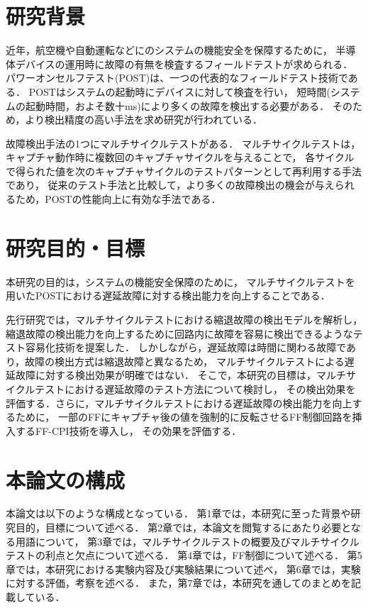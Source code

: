 
\section{研究背景}
近年，航空機や自動運転などにのシステムの機能安全を保障するために，
半導体デバイスの運用時に故障の有無を検査するフィールドテストが求められる．
パワーオンセルフテスト(POST)は、一つの代表的なフィールドテスト技術である．
POSTはシステムの起動時にデバイスに対して検査を行い，
短時間(システムの起動時間，およそ数十ms)により多くの故障を検出する必要がある．
そのため，より検出精度の高い手法を求め研究が行われている．

故障検出手法の1つにマルチサイクルテスト\cite{multicycle}がある．
マルチサイクルテストは，キャプチャ動作時に複数回のキャプチャサイクルを与えることで，
各サイクルで得られた値を次のキャプチャサイクルのテストパターンとして再利用する手法であり，
従来のテスト手法と比較して，より多くの故障検出の機会が与えられるため，POSTの性能向上に有効な手法である．

\section{研究目的・目標}
本研究の目的は，システムの機能安全保障のために，
マルチサイクルテストを用いたPOSTにおける遅延故障に対する検出能力を向上することである．

先行研究では，マルチサイクルテストにおける縮退故障の検出モデルを解析し，
縮退故障の検出能力を向上するために回路内に故障を容易に検出できるようなテスト容易化技術を提案した．
しかしながら，遅延故障は時間に関わる故障であり，故障の検出方式は縮退故障と異なるため，
マルチサイクルテストによる遅延故障に対する検出効果が明確ではない．
そこで，本研究の目標は，マルチサイクルテストにおける遅延故障のテスト方法について検討し，
その検出効果を評価する．さらに，マルチサイクルテストにおける遅延故障の検出能力を向上するために，
一部のFFにキャプチャ後の値を強制的に反転させるFF制御回路を挿入するFF-CPI技術を導入し，
その効果を評価する．

\section{本論文の構成}
本論文は以下のような構成となっている．
第1章では，本研究に至った背景や研究目的，目標について述べる．
第2章では，本論文を閲覧するにあたり必要となる用語について，
第3章では，マルチサイクルテストの概要及びマルチサイクルテストの利点と欠点について述べる．
第4章では，FF制御について述べる．
第5章では，本研究における実験内容及び実験結果について述べ，
第6章では，実験に対する評価，考察を述べる．
また，第7章では，本研究を通してのまとめを記載している．
